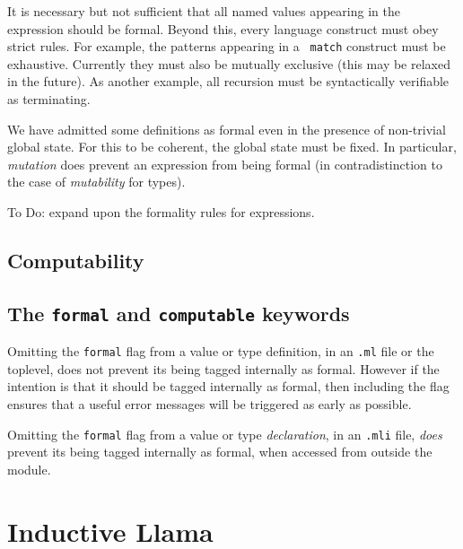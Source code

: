 \documentclass[11pt]{article}
\begin{document}
It is necessary but not sufficient that all named values appearing in
the expression should be formal. Beyond this, every language construct
must obey strict rules. For example, the patterns appearing in a {\tt
  match} construct must be exhaustive. Currently they must also be
mutually exclusive (this may be relaxed in the future).  As another
example, all recursion must be syntactically verifiable as
terminating.

We have admitted some definitions as formal even in the presence of
non-trivial global state. For this to be coherent, the global state must be fixed.
In particular, {\it mutation} does prevent an expression from being formal
(in contradistinction to the case of {\it mutability} for types).

To Do: expand upon the formality rules for expressions.

\subsection{Computability}

\subsection{The {\tt formal} and {\tt computable} keywords}

Omitting the {\tt formal} flag from a value or type definition, in an
{\tt *.ml} file or the toplevel, does not prevent its being tagged
internally as formal. However if the intention is that it should be
tagged internally as formal, then including the flag ensures that a
useful error messages will be triggered as early as possible.

Omitting the {\tt formal} flag from a value or type {\it declaration},
in an {\tt *.mli} file, {\it does} prevent its being tagged internally
as formal, when accessed from outside the module.

\section{Inductive Llama}
\end{document}
